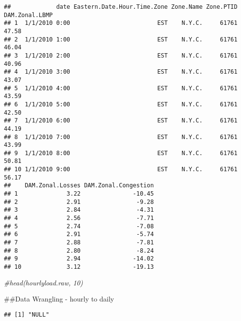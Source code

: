 \documentclass[
]{article}
\newenvironment{Shaded}{\begin{snugshade}}{\end{snugshade}}
\newcommand{\CommentTok}[1]{\textcolor[rgb]{0.56,0.35,0.01}{\textit{#1}}}
\newcommand{\FunctionTok}[1]{\textcolor[rgb]{0.00,0.00,0.00}{#1}}
\newcommand{\NormalTok}[1]{#1}
\newcommand{\SpecialCharTok}[1]{\textcolor[rgb]{0.00,0.00,0.00}{#1}}
\begin{document}
\begin{verbatim}
##             date Eastern.Date.Hour.Time.Zone Zone.Name Zone.PTID DAM.Zonal.LBMP
## 1  1/1/2010 0:00                         EST    N.Y.C.     61761          47.58
## 2  1/1/2010 1:00                         EST    N.Y.C.     61761          46.04
## 3  1/1/2010 2:00                         EST    N.Y.C.     61761          40.96
## 4  1/1/2010 3:00                         EST    N.Y.C.     61761          43.07
## 5  1/1/2010 4:00                         EST    N.Y.C.     61761          43.59
## 6  1/1/2010 5:00                         EST    N.Y.C.     61761          42.50
## 7  1/1/2010 6:00                         EST    N.Y.C.     61761          44.19
## 8  1/1/2010 7:00                         EST    N.Y.C.     61761          43.99
## 9  1/1/2010 8:00                         EST    N.Y.C.     61761          50.81
## 10 1/1/2010 9:00                         EST    N.Y.C.     61761          56.17
##    DAM.Zonal.Losses DAM.Zonal.Congestion
## 1              3.22               -10.45
## 2              2.91                -9.28
## 3              2.84                -4.31
## 4              2.56                -7.71
## 5              2.74                -7.08
## 6              2.91                -5.74
## 7              2.88                -7.81
## 8              2.80                -8.24
## 9              2.94               -14.02
## 10             3.12               -19.13
\end{verbatim}

\begin{Shaded}
\begin{Highlighting}[]
\CommentTok{\#head(hourlyload.raw, 10)}
\end{Highlighting}
\end{Shaded}

\#\#Data Wrangling - hourly to daily

\begin{Shaded}
\end{Shaded}

\begin{verbatim}
## [1] "NULL"
\end{verbatim}

\begin{Shaded}
\end{Shaded}
\end{document}
